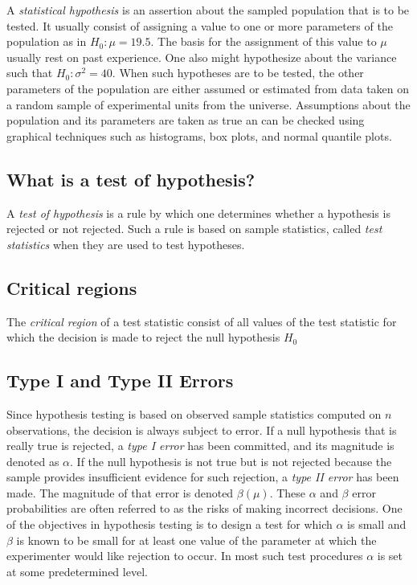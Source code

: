 \documentclass{WileySev}
\begin{document}
A \textit{statistical hypothesis} is an assertion about the sampled population that is to be tested. It usually consist of assigning a value to one or more parameters of the population as in $H_0:\mu = 19.5$. The basis for the assignment of this value to $\mu$ usually rest on past experience. One also might hypothesize about the variance such that $H_0: \sigma^2 = 40$. When such hypotheses are to be tested, the other parameters of the population are either assumed or estimated from data taken on a random sample of experimental units from the universe. Assumptions about the population and its parameters are taken as true an can be checked using graphical techniques such as histograms, box plots, and normal quantile plots.

\subsection{What is a test of hypothesis?}

A \textit{test of hypothesis} is a rule by which one determines whether a hypothesis is rejected or not rejected. Such a rule is based on sample statistics, called \textit{test statistics} when they are used to test hypotheses.

\subsection{Critical regions}

The \textit{critical region} of a test statistic consist of all values of the test statistic for which the decision is made to reject the null hypothesis $H_0$

\subsection{Type I and Type II Errors}

Since hypothesis testing is based on observed sample statistics computed on $n$ observations, the decision is always subject to error. If a null hypothesis that is really true is rejected, a \textit{type I error} has been committed, and its magnitude is denoted as $\alpha$. If the null hypothesis is not true but is not rejected because the sample provides insufficient evidence for such rejection, a \textit{type II error} has been made. The magnitude of that error is denoted $\beta(\mu)$.
These $\alpha$ and $\beta$ error probabilities are often referred to as the risks of making incorrect decisions. One of the objectives in hypothesis testing is to design a test for which $\alpha$ is small and $\beta$ is known to be small for at least one value of the parameter at which the experimenter would like rejection to occur. In most such test procedures $\alpha$ is set at some predetermined level.
\end{document}
